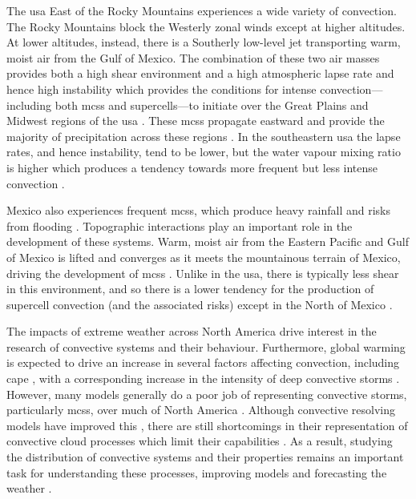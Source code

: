 The \acrfull{usa} East of the Rocky Mountains experiences a wide variety of convection.
The Rocky Mountains block the Westerly zonal winds except at higher altitudes.
At lower altitudes, instead, there is a Southerly low-level jet transporting warm, moist air from the Gulf of Mexico.
The combination of these two air masses provides both a high shear environment and a high atmospheric lapse rate and hence high instability which provides the conditions for intense convection---including both \acrshort{mcs}s and supercells---to initiate over the Great Plains and Midwest regions of the \acrshort{usa} \citep{coniglio_environmental_2010, song_contrasting_2019}.
These \acrshort{mcs}s propagate eastward and provide the majority of precipitation across these regions \citep{feng_spatiotemporal_2019}.
In the southeastern \acrshort{usa} the lapse rates, and hence instability, tend to be lower, but the water vapour mixing ratio is higher which produces a tendency towards more frequent but less intense convection \citep{brooks_climatological_2007a}.

Mexico also experiences frequent \acrshort{mcs}s, which produce heavy rainfall and risks from flooding \citep{douglas_mexican_1993}.
Topographic interactions play an important role in the development of these systems.
Warm, moist air from the Eastern Pacific and Gulf of Mexico is lifted and converges as it meets the mountainous terrain of Mexico, driving the development of \acrshort{mcs}s \citep{farfan_moving_1994}.
Unlike in the \acrshort{usa}, there is typically less shear in this environment, and so there is a lower tendency for the production of supercell convection (and the associated risks) except in the North of Mexico \citep{weiss_supercells_2008}.

The impacts of extreme weather across North America drive interest in the research of convective systems and their behaviour.
Furthermore, global warming is expected to drive an increase in several factors affecting convection, including \acrshort{cape} \citep{seeley_why_2015}, with a corresponding increase in the intensity of deep convective storms \citep{trapp_changes_2007, seeley_effect_2015}.
However, many models generally do a poor job of representing convective storms, particularly \acrshort{mcs}s, over much of North America \citep{pinto_assessment_2015}.
Although convective resolving models have improved this \citep{stevens_added_2020}, there are still shortcomings in their representation of convective cloud processes which limit their capabilities \citep{jeevanjee_vertical_2017, prein_sensitivity_2021}.
As a result, studying the distribution of convective systems and their properties remains an important task for understanding these processes, improving models and forecasting the weather \citep{brooks_century_2019}.

